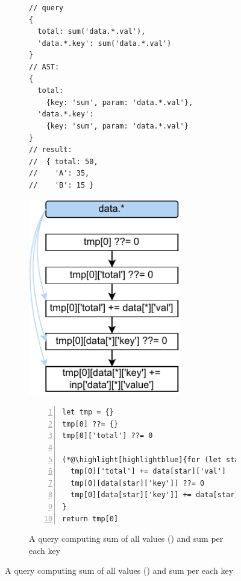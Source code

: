 \documentclass[runningheads]{llncs}
\begin{document}
\begin{figure}[t!]
\begin{subfigure}{\textwidth}
\begin{minipage}{0.33\textwidth}
\begin{lstlisting}[style=JavaScriptTiny, columns=flexible]
// query
{
  total: sum('data.*.val'),
  'data.*.key': sum('data.*.val')
}
// AST:
{
  total:
    {key: 'sum', param: 'data.*.val'},
  'data.*.key':
    {key: 'sum', param: 'data.*.val'}
}
// result:
//  { total: 50, 
//    'A': 35,
//    'B': 15 }
\end{lstlisting}
\end{minipage}
\begin{minipage}{0.27\textwidth}
\centering
\includegraphics[width=0.73\textwidth]{images/intro_q2_ir.pdf}
\end{minipage}
\begin{minipage}{0.4\textwidth}
\begin{lstlisting}[style=JavaScriptTiny, columns=flexible, numbers=left, xleftmargin=2pt]
let tmp = {}
tmp[0] ??= {}
tmp[0]['total'] ??= 0

(*@\highlight[highlightblue]{for (let star in data) }@*) {
  tmp[0]['total'] += data[star]['val']
  tmp[0][data[star]['key']] ??= 0
  tmp[0][data[star]['key']] += data[star]['val']
}
return tmp[0]
\end{lstlisting}
\end{minipage}
\caption{A query computing sum of all values
() and sum per each key}\label{fig:intro_q2}
\end{subfigure}


\end{figure}
\end{document}
